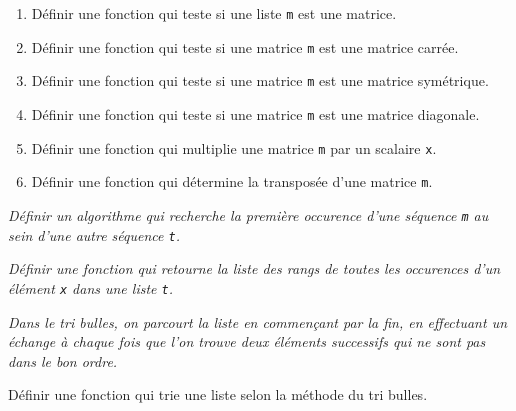 \begin{td}\label{td:matrices2}
\em
\begin{enumerate}
\item Définir une fonction qui teste si une liste {\tt m} est une matrice.
\item Définir une fonction qui teste si une matrice {\tt m} est une matrice carrée.
\item Définir une fonction qui teste si une matrice {\tt m} est une matrice symétrique.
\item Définir une fonction qui teste si une matrice {\tt m} est une matrice diagonale.
\item Définir une fonction qui multiplie une matrice {\tt m} par un scalaire {\tt x}.
\item Définir une fonction qui détermine la transposée d'une matrice {\tt m}.
\end{enumerate}
\end{td}


\begin{td}\label{td:motif}
\em
Définir un algorithme qui recherche la première occurence d'une séquence {\tt m}
au sein d'une autre séquence {\tt t}.
\end{td}

\begin{td}\label{td:occurs}
\em
Définir une fonction qui retourne la liste des rangs de toutes les occurences
d'un élément {\tt x} dans une liste {\tt t}.
\end{td}

\begin{td}\label{td:bulles}
\em
Dans le tri bulles, on parcourt la liste en commençant par la fin, en effectuant un échange à
chaque fois que l'on trouve deux éléments successifs qui ne sont pas dans le bon ordre.

\noindent Définir une fonction qui trie une liste selon la méthode du tri bulles.
\end{td}

